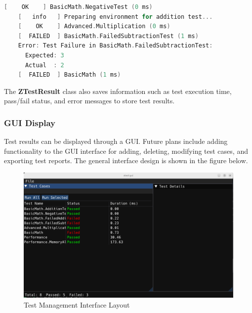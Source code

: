 \documentclass[english]{article}
\begin{document}
\begin{lstlisting}[language=C++]
    [    OK    ] BasicMath.NegativeTest (0 ms)
    [   info   ] Preparing environment for addition test...
    [    OK    ] Advanced.Multiplication (0 ms)
    [  FAILED  ] BasicMath.FailedSubtractionTest (1 ms)
    Error: Test Failure in BasicMath.FailedSubtractionTest:
      Expected: 3
      Actual  : 2
    [  FAILED  ] BasicMath (1 ms)
\end{lstlisting}
The \textbf{ZTestResult} class also saves information such as test execution time, pass/fail status, and error messages to store test results.
\subsubsection{GUI Display}
Test results can be displayed through a GUI. Future plans include adding functionality to the GUI interface for adding, deleting, modifying test cases, and exporting test reports. The general interface design is shown in the figure below.
\begin{figure}[H]
    \centering
    \includegraphics[width=\textwidth]{img/gui.png}
    \caption{Test Management Interface Layout}
    \label{fig:gui}
    \small
\end{figure}
\end{document}
